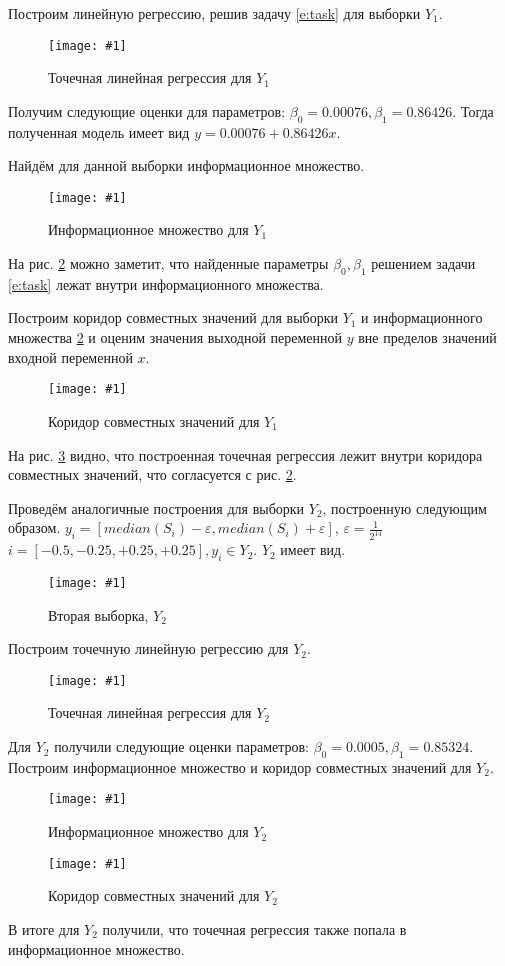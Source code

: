\documentclass[a4paper,12pt]{article}
\newcommand{\plot}[3]{
    \begin{figure}[H]
        \begin{center}
            \texttt{[image: \#1]}
            \caption{#2}
            \label{#3}
        \end{center}
    \end{figure}
}
\begin{document}

    Построим линейную регрессию, решив задачу \ref{e:task} для выборки $ Y_1 $.
    \plot{PointRegressionY1}{Точечная линейная регрессия для $ Y_1 $}{p:regressionY1}

    Получим следующие оценки для параметров: $ \beta_0 = 0.00076, \beta_1 = 0.86426 $.
    Тогда полученная модель имеет вид $ y = 0.00076 + 0.86426 x $.

    Найдём для данной выборки информационное множество.
    \plot{InformSetY1}{Информационное множество для $ Y_1 $}{p:informSetY1}

    На рис. \ref{p:informSetY1} можно заметит, что найденные параметры
    $ \beta_0, \beta_1 $ решением задачи \ref{e:task} лежат внутри информационного множества.

    Построим коридор совместных значений для выборки $ Y_1 $ и информационного множества \ref{p:informSetY1}
    и оценим значения выходной переменной $ y $ вне пределов значений входной переменной $ x $.
    \plot{InformSetCorridorY1}{Коридор совместных значений для $ Y_1 $}{p:informSetCorridorY1}

    На рис. \ref{p:informSetCorridorY1} видно, что построенная точечная регрессия лежит внутри коридора совместных значений,
    что согласуется с рис. \ref{p:informSetY1}.

    Проведём аналогичные построения для выборки $ Y_2 $, построенную следующим образом.
    $ y_i = [median(S_i) - \varepsilon, median(S_i) + \varepsilon] $, $ \varepsilon = \frac{1}{2^{14}} $
    $ i = [-0.5, -0.25, +0.25, +0.25], y_i \in Y_2 $.
    $ Y_2 $ имеет вид.
    \plot{Y2}{Вторая выборка, $ Y_2 $}{p:sampleY2}


    Построим точечную линейную регрессию для $ Y_2 $.
    \plot{PointRegressionY2}{Точечная линейная регрессия для $ Y_2 $}{p:regressionY2}

    Для $ Y_2 $ получили следующие оценки параметров: $ \beta_0 = 0.0005, \beta_1 = 0.85324 $.
    Построим информационное множество и коридор совместных значений для $ Y_2 $.

    \plot{InformSetY2}{Информационное множество для $ Y_2 $}{p:informSetY2}
    \plot{InformSetCorridorY2}{Коридор совместных значений для $ Y_2 $}{p:informSetCorridorY2}

    В итоге для $ Y_2 $ получили, что точечная регрессия также попала в информационное множество.
\end{document}
